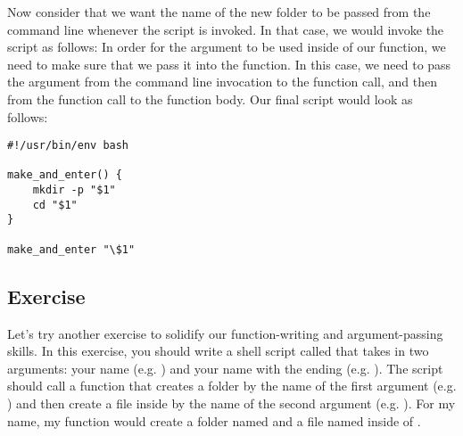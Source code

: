 \documentclass{article}
\begin{document}
Now consider that we want the name of the new folder to be passed from the command line whenever the script is invoked. In that case, we would invoke the script as follows: 
In order for the argument  to be used inside of our function, we need to make sure that we pass it into the function. In this case, we need to pass the argument from the command line invocation to the function call, and then from the function call to the function body. Our final script would look as follows: 
\begin{lstlisting}[style=Python]
#!/usr/bin/env bash

make_and_enter() {
	mkdir -p "$1"
	cd "$1"
}

make_and_enter "\$1"
\end{lstlisting}

\subsection{Exercise}
Let's try another exercise to solidify our function-writing and argument-passing skills. In this exercise, you should write a shell script called  that takes in two arguments: your name (e.g. ) and your name with the  ending (e.g. ).  The script should call a function that creates a folder by the name of the first argument (e.g. ) and then create a file inside by the name of the second argument (e.g. ).
For my name, my function would create a folder named  and a file named  inside of .
\end{document}
